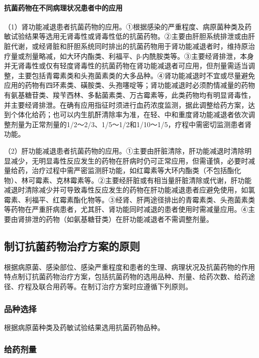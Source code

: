 \paragraph{抗菌药物在不同病理状况患者中的应用}

（1）肾功能减退患者抗菌药物的应用。①根据感染的严重程度、病原菌种类及药敏试验结果等选用无肾毒性或肾毒性低的抗菌药物。②主要由肝胆系统排泄或由肝脏代谢，或经肾脏和肝胆系统同时排出的抗菌药物用于肾功能减退者时，维持原治疗量或剂量略减，如大环内酯类、利福平、β-内酰胺类等。③主要经肾排泄，本身并无肾毒性或仅有轻度肾毒性的抗菌药物在肾功能减退者可应用，但剂量需适当调整，主要包括青霉素类和头孢菌素类的大多品种。④肾功能减退时不宜或尽量避免应用的药物有四环素类、磺胺类、头孢噻啶等；肾功能减退时必须酌情减量的药物有氨基糖苷类、羧苄西林、多黏菌素类、万古霉素等，此类药物均有明显肾毒性，并主要经肾排泄。在确有应用指征时须进行血药浓度监测，据此调整给药方案，达到个体化给药；也可以内生肌酐清除率为准，在轻、中和重度肾功能减退者依次调整剂量为正常剂量的1/2～2/3、1/5～1/2和1/10～1/5，疗程中需密切监测患者肾功能。

（2）肝功能减退患者抗菌药物的应用。①主要由肝脏清除，肝功能减退时清除明显减少，无明显毒性反应发生的药物在肝病时仍可正常应用，但需谨慎，必要时减量给药，治疗过程中需严密监测肝功能，如红霉素等大环内酯类（不包括酯化物）、林可霉素、克林霉素等。②主要经肝脏或有相当量肝脏清除或代谢，肝功能减退时清除减少并可导致毒性反应发生的药物在肝功能减退患者应避免使用，如氯霉素、利福平、红霉素酯化物等。③经肾、肝两途径排出的青霉素类、头孢菌素类等药物在严重肝病患者，尤其肝、肾功能同时减退的患者使用时需减量应用。④主要由肾排泄的药物（如氨基糖苷类）在肝功能减退者不需调整剂量。

\subsection{制订抗菌药物治疗方案的原则}

根据病原菌、感染部位、感染严重程度和患者的生理、病理状况及抗菌药物的作用特点制订抗菌药物治疗方案，包括抗菌药物的选用品种、剂量、给药次数、给药途径、疗程及联合用药等。在制订治疗方案时应遵循下列原则。

\subsubsection{品种选择}

根据病原菌种类及药敏试验结果选用抗菌药物品种。

\subsubsection{给药剂量}

